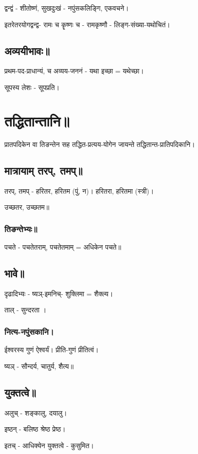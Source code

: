 \documentclass[oneside, article]{memoir}
\begin{document}
द्वन्द्वं - शीतोष्णं, सुखदुःखं - नपुंसकलिङ्गि, एकवचने।

इतरेतरयोगद्वन्द्व- रामः च कॄष्णः च - रामकृष्णौ - लिङ्ग-संख्या-यथोचितं।



\subsection{अव्ययीभावः॥}
प्रथम-पद-प्राधान्यं, च अव्यय-जननं - यथा इच्छा = यथेच्छा।

सूपस्य लेशः - सूपप्रति।



\section{तद्धितान्तानि॥}
प्रातपदिकेन वा तिङन्तेन सह तद्धित-प्रत्यय-योगेन जायन्ते तद्धितान्त-प्रातिपदिकानि।

\subsection{मात्रायाम् तरप्, तमप्॥}
तरप्, तमप् - हरितर, हरितम (पुं, न)। हरितरा, हरितमा (स्त्री)।

उच्छतर, उच्छतम॥

\subsubsection{तिङन्तेभ्यः॥}
पचते - पचतेतराम्, पचतेतमाम् = अधिकेन पचते॥

\subsection{भावे॥}
दृढादिभ्यः - ष्यञ्-इमनिच्- शुक्लिमा = शैक्ल्य।

ताल् - सुन्दरता ।

\subsubsection{नित्य-नपुंसकानि।}
ईश्वरस्य गुणं ऐश्वर्यं। प्रीति-गुणं प्रीतित्वं।

ष्यञ् - सौन्दर्य, चातुर्य, शैत्य॥

\subsection{युक्तत्वे॥}
अलुच् - शङ्कालु, दयालु।

इष्ठन् - बलिष्ठ श्रेष्ठ प्रेष्ठ।

इतच् - आधिक्येन युक्तत्वे - कुसुमित।
\end{document}
